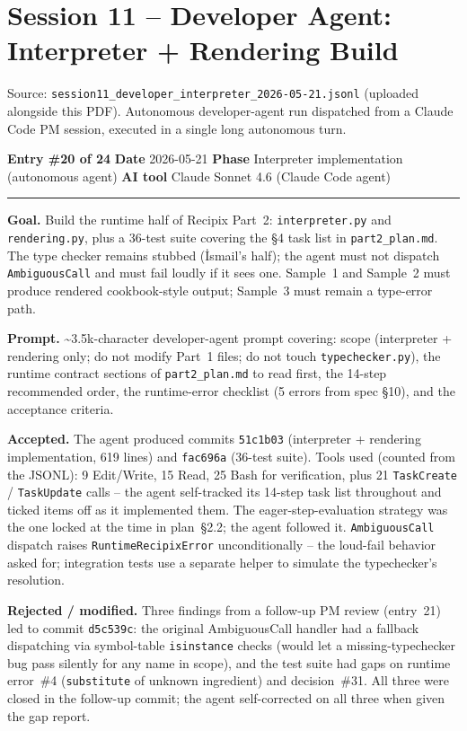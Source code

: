 \documentclass[11pt,a4paper]{article}
\newcommand{\entryheader}[4]{%
    \par\vspace{1em}\noindent\textbf{Entry \#{#1}} \textbullet{} \textbf{Date} #2 \textbullet{} \textbf{Phase} #3 \textbullet{} \textbf{AI tool} #4 \par\vspace{0.3em}\noindent\rule{\textwidth}{0.4pt}\par\vspace{0.3em}}
\newcommand{\field}[1]{\noindent\textbf{#1}}
\begin{document}
\section{Session 11 -- Developer Agent: Interpreter + Rendering Build}

Source: \texttt{session11\_developer\_interpreter\_2026-05-21.jsonl}
(uploaded alongside this PDF). Autonomous developer-agent run
dispatched from a Claude Code PM session, executed in a single long
autonomous turn.

\entryheader{20 of 24}{2026-05-21}{Interpreter implementation (autonomous agent)}{Claude Sonnet 4.6 (Claude Code agent)}

\field{Goal.} Build the runtime half of Recipix Part~2:
\texttt{interpreter.py} and \texttt{rendering.py}, plus a 36-test suite
covering the \S4 task list in \texttt{part2\_plan.md}. The type checker
remains stubbed (İsmail's half); the agent must not dispatch
\texttt{AmbiguousCall} and must fail loudly if it sees one. Sample~1
and Sample~2 must produce rendered cookbook-style output; Sample~3
must remain a type-error path.

\field{Prompt.} \textasciitilde 3.5k-character developer-agent prompt
covering: scope (interpreter + rendering only; do not modify Part~1
files; do not touch \texttt{typechecker.py}), the runtime contract
sections of \texttt{part2\_plan.md} to read first, the 14-step
recommended order, the runtime-error checklist (5 errors from spec
\S10), and the acceptance criteria.

\field{Accepted.} The agent produced commits \texttt{51c1b03}
(interpreter + rendering implementation, 619 lines) and \texttt{fac696a}
(36-test suite). Tools used (counted from the JSONL): 9 Edit/Write,
15 Read, 25 Bash for verification, plus 21 \texttt{TaskCreate} /
\texttt{TaskUpdate} calls -- the agent self-tracked its 14-step task
list throughout and ticked items off as it implemented them. The
eager-step-evaluation strategy was the one locked at the time in
plan~\S2.2; the agent followed it. \texttt{AmbiguousCall} dispatch
raises \texttt{RuntimeRecipixError} unconditionally -- the loud-fail
behavior asked for; integration tests use a separate helper to simulate
the typechecker's resolution.

\field{Rejected / modified.} Three findings from a follow-up PM review
(entry~21) led to commit \texttt{d5c539c}: the original AmbiguousCall
handler had a fallback dispatching via symbol-table \texttt{isinstance}
checks (would let a missing-typechecker bug pass silently for any name
in scope), and the test suite had gaps on runtime error~\#4
(\texttt{substitute} of unknown ingredient) and decision~\#31. All
three were closed in the follow-up commit; the agent self-corrected on
all three when given the gap report.
\end{document}
